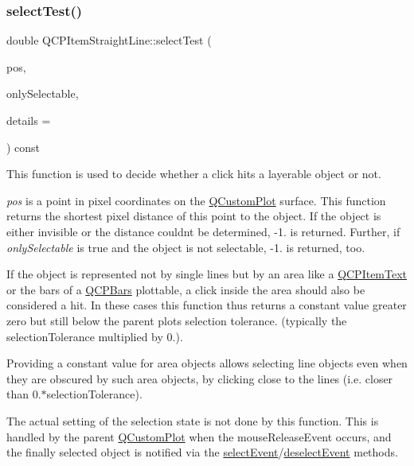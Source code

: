 \mbox{\label{class_q_c_p_item_straight_line_a2e36c9d4dcc3aeda78a5584f790e39e3}} 
\subsubsection{\texorpdfstring{select\+Test()}{selectTest()}}
{\footnotesize\ttfamily double Q\+C\+P\+Item\+Straight\+Line\+::select\+Test (\begin{DoxyParamCaption}\item[{const Q\+PointF \&}]{pos,  }\item[{bool}]{only\+Selectable,  }\item[{Q\+Variant $\ast$}]{details = {} }\end{DoxyParamCaption}) const\hspace{0.3cm}{\ttfamily [virtual]}}

This function is used to decide whether a click hits a layerable object or not.

{\itshape pos} is a point in pixel coordinates on the \hyperlink{class_q_custom_plot}{Q\+Custom\+Plot} surface. This function returns the shortest pixel distance of this point to the object. If the object is either invisible or the distance couldn\textquotesingle{}t be determined, -\/1. is returned. Further, if {\itshape only\+Selectable} is true and the object is not selectable, -\/1. is returned, too.

If the object is represented not by single lines but by an area like a \hyperlink{class_q_c_p_item_text}{Q\+C\+P\+Item\+Text} or the bars of a \hyperlink{class_q_c_p_bars}{Q\+C\+P\+Bars} plottable, a click inside the area should also be considered a hit. In these cases this function thus returns a constant value greater zero but still below the parent plot\textquotesingle{}s selection tolerance. (typically the selection\+Tolerance multiplied by 0.).

Providing a constant value for area objects allows selecting line objects even when they are obscured by such area objects, by clicking close to the lines (i.\+e. closer than 0.$\ast$selection\+Tolerance).

The actual setting of the selection state is not done by this function. This is handled by the parent \hyperlink{class_q_custom_plot}{Q\+Custom\+Plot} when the mouse\+Release\+Event occurs, and the finally selected object is notified via the \hyperlink{class_q_c_p_abstract_item_aa4b969c58797f39c9c0b6c07c7869d17}{select\+Event}/\hyperlink{class_q_c_p_abstract_item_af9093798cb07a861dcc73f93ca16c0c1}{deselect\+Event} methods.

